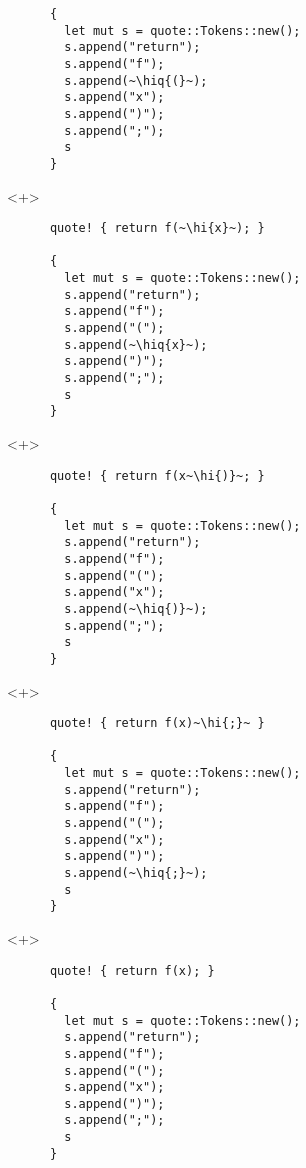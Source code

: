 \documentclass[usepdftitle=false]{beamer}
\renewcommand{\&}{\makebox[\widthof{\ampersand}][c]{\scalebox{0.9}[1.0]{\Book\ampersand}}}
\newcommand{\+}{\makebox[\widthof{+}][c]{\raisebox{-.2\height}{\scalefont{1.5}\Light+}}}
\newcommand{\hi}[1]{%
\tikz[baseline=(A.base)]
 \node[highlighting=0,inner sep=0pt,text depth=0pt] (A) {#1};%
}
\newcommand{\hiq}[1]{\hi{''#1''}}
\begin{document}
\begin{frame}[fragile]
\begin{onlyenv}
\begin{verbatim}
      {
        let mut s = quote::Tokens::new();
        s.append("return");
        s.append("f");
        s.append(~\hiq{(}~);
        s.append("x");
        s.append(")");
        s.append(";");
        s
      }
    \end{verbatim}
  \end{onlyenv}
  \begin{onlyenv}<+>
    \begin{verbatim}
      quote! { return f(~\hi{x}~); }

      {
        let mut s = quote::Tokens::new();
        s.append("return");
        s.append("f");
        s.append("(");
        s.append(~\hiq{x}~);
        s.append(")");
        s.append(";");
        s
      }
    \end{verbatim}
  \end{onlyenv}
  \begin{onlyenv}<+>
    \begin{verbatim}
      quote! { return f(x~\hi{)}~; }

      {
        let mut s = quote::Tokens::new();
        s.append("return");
        s.append("f");
        s.append("(");
        s.append("x");
        s.append(~\hiq{)}~);
        s.append(";");
        s
      }
    \end{verbatim}
  \end{onlyenv}
  \begin{onlyenv}<+>
    \begin{verbatim}
      quote! { return f(x)~\hi{;}~ }

      {
        let mut s = quote::Tokens::new();
        s.append("return");
        s.append("f");
        s.append("(");
        s.append("x");
        s.append(")");
        s.append(~\hiq{;}~);
        s
      }
    \end{verbatim}
  \end{onlyenv}
  \begin{onlyenv}<+>
    \begin{verbatim}
      quote! { return f(x); }

      {
        let mut s = quote::Tokens::new();
        s.append("return");
        s.append("f");
        s.append("(");
        s.append("x");
        s.append(")");
        s.append(";");
        s
      }
    \end{verbatim}
  \end{onlyenv}
\end{frame}
\end{document}
